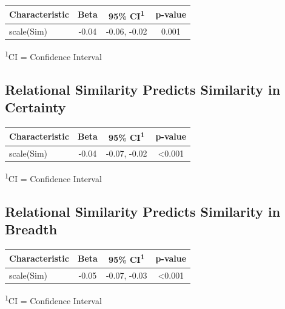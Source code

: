 \documentclass[
  .7em,
  letterpaper,
  DIV=11,
  numbers=noendperiod]{scrartcl}
\begin{document}
\captionsetup[table]{labelformat=empty,skip=1pt}
\setlength{\LTpost}{0mm}
\begin{longtable}{lccc}
\toprule
\textbf{Characteristic} & \textbf{Beta} & \textbf{95\% CI}\textsuperscript{1} & \textbf{p-value} \\ 
\midrule
scale(Sim) & -0.04 & -0.06, -0.02 & 0.001 \\ 
\bottomrule
\end{longtable}
\begin{minipage}{\linewidth}
\textsuperscript{1}CI = Confidence Interval\\
\end{minipage}

\hypertarget{relational-similarity-predicts-similarity-in-certainty}{%
\subsection{Relational Similarity Predicts Similarity in
Certainty}\label{relational-similarity-predicts-similarity-in-certainty}}

\captionsetup[table]{labelformat=empty,skip=1pt}
\setlength{\LTpost}{0mm}
\begin{longtable}{lccc}
\toprule
\textbf{Characteristic} & \textbf{Beta} & \textbf{95\% CI}\textsuperscript{1} & \textbf{p-value} \\ 
\midrule
scale(Sim) & -0.04 & -0.07, -0.02 & <0.001 \\ 
\bottomrule
\end{longtable}
\begin{minipage}{\linewidth}
\textsuperscript{1}CI = Confidence Interval\\
\end{minipage}

\hypertarget{relational-similarity-predicts-similarity-in-breadth}{%
\subsection{Relational Similarity Predicts Similarity in
Breadth}\label{relational-similarity-predicts-similarity-in-breadth}}

\captionsetup[table]{labelformat=empty,skip=1pt}
\setlength{\LTpost}{0mm}
\begin{longtable}{lccc}
\toprule
\textbf{Characteristic} & \textbf{Beta} & \textbf{95\% CI}\textsuperscript{1} & \textbf{p-value} \\ 
\midrule
scale(Sim) & -0.05 & -0.07, -0.03 & <0.001 \\ 
\bottomrule
\end{longtable}
\begin{minipage}{\linewidth}
\textsuperscript{1}CI = Confidence Interval\\
\end{minipage}
\end{document}
